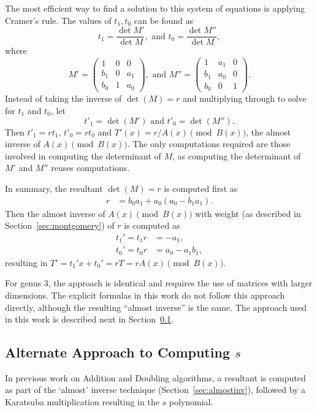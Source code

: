 The most efficient way to find a solution to this system of equations is
applying Cramer's rule. The values of $t_1, t_0$ can be found as 
$$ t_1 = \frac{\det{M'}}{\det{M}}, \mbox{ and  } t_0 = \frac{\det{M''}}{\det{M}}, $$ where 
$$ M' = \left( \begin{array}{ccc}
1   & 0 & 0  \\
b_1 & 0 & a_1  \\
b_0 & 1 & a_0  \end{array} \right), \mbox{ and } M'' = \left( \begin{array}{ccc}
1   & a_1 & 0  \\
b_1 & a_0 & 0  \\
b_0 & 0   & 1  \end{array} \right).$$  Instead of taking the inverse of $\det(M)
= r$ and multiplying through to solve for $t_1$ and $t_0$, let $$  t'_1 =
\det(M') \mbox{ and } t'_0 = \det(M''). $$ Then $t'_1 = rt_1$, $t'_0 =rt_0$ and
$T'(x) = r/A(x) \pmod{B(x)}$, the almost inverse of $A(x) \pmod{B(x)}$. The only computations
required are those involved in computing the determinant of $M$, as computing
the determinant of $M'$ and $M''$ reuses computations.

In summary, the resultant $\det(M) = r$ is computed first as
\begin{align*} r &= b_0a_1 + a_0(a_0 - b_1a_1).
\end{align*}  
Then the almost inverse of $A(x) \pmod{B(x)}$ with weight (as described in Section~\ref{sec:montgomery}) of $r$ is computed as
\begin{align*}
t_1' = t_1r  &= -a_1, \\
t_0' = t_0r  &= a_0 - a_1b_1, \end{align*} 
resulting in $T' = t_1'x + t_0' = rT = rA(x) \pmod{B(x)}$. 

For genus 3, the approach is identical and requires the use of matrices with
larger dimensions. The explicit formulas in this work do not follow this
approach directly, although the resulting ``almost inverse'' is the same. The
approach used in this work is described next in Section~\ref{sec:alternateharley}.


\subsection{Alternate Approach to Computing \texorpdfstring{$s$}{s}}
\label{sec:alternateharley}
In previous work on Addition and Doubling algorithms, a resultant is computed as
part of the `almost' inverse technique (Section~\ref{sec:almostinv}), followed
by a Karatsuba multiplication resulting in the $s$ polynomial.

